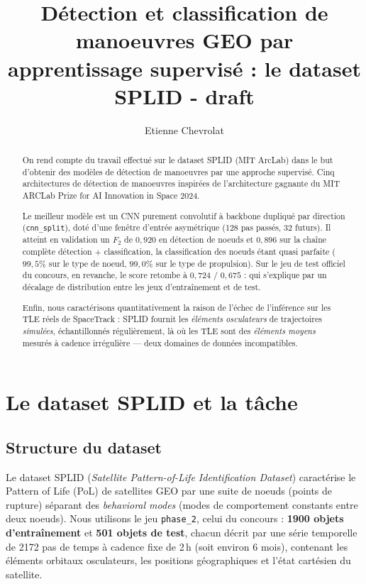 \documentclass{article}
\title{Détection et classification de manoeuvres GEO par apprentissage supervisé : le dataset SPLID - draft}
\author{Etienne Chevrolat}
\date{}
\begin{document}
\maketitle

\begin{abstract}
    On rend compte du travail effectué sur le dataset SPLID (MIT ArcLab) dans le but d'obtenir des modèles de détection de manoeuvres par une approche supervisé. Cinq architectures de détection de manoeuvres inspirées de l'architecture gagnante du {MIT ARCLab Prize for AI Innovation in Space 2024}.

    Le meilleur modèle est un CNN purement convolutif à backbone dupliqué par direction (\texttt{cnn\_split}), doté d'une fenêtre d'entrée asymétrique (128 pas passés, 32 futurs). Il atteint en validation un $F_2$ de $0{,}920$ en détection de noeuds et $0{,}896$ sur la chaîne complète détection + classification, la classification des noeuds étant quasi parfaite ($99{,}5\%$ sur le type de noeud, $99{,}0\%$ sur le type de propulsion).
    Sur le jeu de test officiel du concours, en revanche, le score retombe à $0{,}724$ / $0{,}675$ : qui s'explique par un décalage de distribution entre les jeux d'entraînement et de test.

    Enfin, nous caractérisons quantitativement la raison de l'échec de l'inférence sur les TLE réels de SpaceTrack : SPLID fournit les \emph{éléments osculateurs} de trajectoires \emph{simulées}, échantillonnés régulièrement, là où les TLE sont des \emph{éléments moyens} mesurés à cadence irrégulière — deux domaines de données incompatibles.
\end{abstract}

\section{Le dataset SPLID et la tâche}

\subsection{Structure du dataset}

Le dataset SPLID (\textit{Satellite Pattern-of-Life Identification Dataset}) caractérise le Pattern of Life (PoL) de satellites GEO par une suite de noeuds (points de rupture) séparant des \textit{behavioral modes} (modes de comportement constants entre deux noeuds).
Nous utilisons le jeu \texttt{phase\_2}, celui du concours : \textbf{1900 objets d'entraînement} et \textbf{501 objets de test}, chacun décrit par une série temporelle de 2172 pas de temps à cadence fixe de 2\,h (soit environ 6 mois), contenant les éléments orbitaux osculateurs, les positions géographiques et l'état cartésien du satellite.
\end{document}
